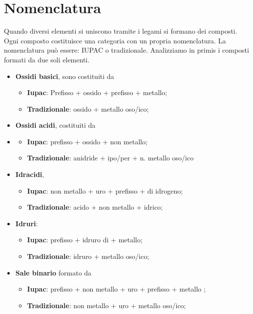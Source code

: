 \documentclass[11pt, a4paper, openright]{book}
\begin{document}
\section{Nomenclatura}
Quando diversi elementi si uniscono tramite i legami si formano dei composti.
Ogni composto costituisce una categoria con un propria nomenclatura.
La nomenclatura può essere: IUPAC o tradizionale.
Analizziamo in primis i composti formati da due soli elementi.
\begin{itemize}
    \item \textbf{Ossidi basici}, sono costituiti da  \begin{itemize}
        \item \textbf{Iupac}: Prefisso + ossido + prefisso + metallo;
        \item \textbf{Tradizionale}: ossido + metallo oso/ico;
    \end{itemize}
    \item \textbf{Ossidi acidi}, costituiti da 
    \item 
    \begin{itemize}
        \item \textbf{Iupac}: prefisso + ossido + non metallo;
        \item \textbf{Tradizionale}: anidride + ipo/per + n. metallo oso/ico
        \end{itemize}
    \item \textbf{Idracidi},  
    \begin{itemize}
        \item \textbf{Iupac}: non metallo + uro + prefisso + di idrogeno;
        \item \textbf{Tradizionale}: acido + non metallo + idrico;
        \end{itemize}
    \item \textbf{Idruri}:  
    \begin{itemize}
        \item \textbf{Iupac}: prefisso + idruro di + metallo;
        \item \textbf{Tradizionale}: idruro + metallo oso/ico;
        \end{itemize}
    \item \textbf{Sale binario} formato da 
    \begin{itemize}
        \item \textbf{Iupac}: prefisso + non metallo + uro + prefisso + metallo ;
        \item \textbf{Tradizionale}: non metallo + uro + metallo oso/ico;
        \end{itemize}
\end{itemize}
\end{document}
